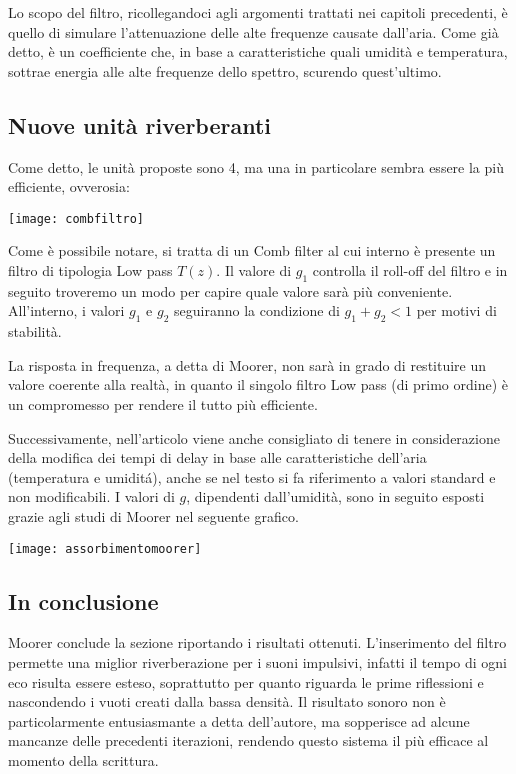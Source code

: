 Lo scopo del filtro, ricollegandoci agli argomenti trattati nei capitoli precedenti, è quello di simulare l’attenuazione delle alte frequenze causate dall’aria. Come già detto, è un coefficiente che, in base a caratteristiche quali umidità e temperatura, sottrae energia alle alte frequenze dello spettro, scurendo quest’ultimo.

\subsection{Nuove unità riverberanti}

Come detto, le unità proposte sono 4, ma una in particolare sembra essere la più efficiente, ovverosia:

\begin{center}
\texttt{[image: combfiltro]}
\end{center}

Come è possibile notare, si tratta di un Comb filter al cui interno è presente un filtro di tipologia Low pass $T(z)$. Il valore di $g_1$ controlla il roll-off del filtro e in seguito troveremo un modo per capire quale valore sarà più conveniente.
All’interno, i valori $g_1$ e $g_2$ seguiranno la condizione di $g_1+g_2<1$ per motivi di stabilità.

La risposta in frequenza, a detta di Moorer,  non sarà in grado di restituire un valore coerente alla realtà, in quanto il singolo filtro Low pass (di primo ordine) è un compromesso per rendere il tutto più efficiente.

Successivamente, nell’articolo viene anche consigliato di tenere in considerazione della modifica dei tempi di delay in base alle caratteristiche dell’aria (temperatura e umiditá), anche se nel testo si fa riferimento a valori standard e non modificabili.
I valori di $g$, dipendenti dall’umidità, sono in seguito esposti grazie agli studi di Moorer nel seguente grafico.

\begin{center}
\texttt{[image: assorbimentomoorer]}
\end{center}

\subsection{In conclusione}

Moorer conclude la sezione riportando i risultati ottenuti. L’inserimento del filtro permette una miglior riverberazione per i suoni impulsivi, infatti il tempo di ogni eco risulta essere esteso, soprattutto per quanto riguarda le prime riflessioni e nascondendo i vuoti creati dalla bassa densità.
Il risultato sonoro non è particolarmente entusiasmante a detta dell’autore, ma sopperisce ad alcune mancanze delle precedenti iterazioni, rendendo questo sistema il più efficace al momento della scrittura.